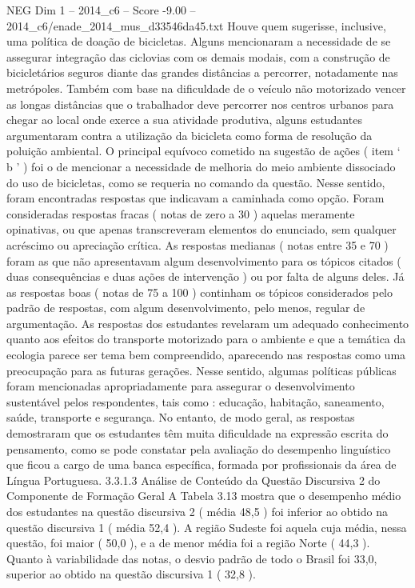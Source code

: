 \begin{textsample}{NEG Dim 1 – 2014\_c6 – Score -9.00 – 2014\_c6/enade\_2014\_mus\_d33546da45.txt}
Houve quem sugerisse, inclusive, uma política de doação de bicicletas.
Alguns mencionaram a necessidade de se assegurar integração das ciclovias com os demais modais, com a construção de bicicletários seguros diante das grandes distâncias a percorrer, notadamente nas metrópoles.
Também com base na dificuldade de o veículo não motorizado vencer as longas distâncias que o trabalhador deve percorrer nos centros urbanos para chegar ao local onde exerce a sua atividade produtiva, alguns estudantes argumentaram contra a utilização da bicicleta como forma de resolução da poluição ambiental.
O principal equívoco cometido na sugestão de ações ( item ‘ b ’ ) foi o de mencionar a necessidade de melhoria do meio ambiente dissociado do uso de bicicletas, como se requeria no comando da questão.
Nesse sentido, foram encontradas respostas que indicavam a caminhada como opção.
Foram consideradas respostas fracas ( notas de zero a 30 ) aquelas meramente opinativas, ou que apenas transcreveram elementos do enunciado, sem qualquer acréscimo ou apreciação crítica.
As respostas medianas ( notas entre 35 e 70 ) foram as que não apresentavam algum desenvolvimento para os tópicos citados ( duas consequências e duas ações de intervenção ) ou por falta de alguns deles.
Já as respostas boas ( notas de 75 a 100 ) continham os tópicos considerados pelo padrão de respostas, com algum desenvolvimento, pelo menos, regular de argumentação.
As respostas dos estudantes revelaram um adequado conhecimento quanto aos efeitos do transporte motorizado para o ambiente e que a temática da ecologia parece ser tema bem compreendido, aparecendo nas respostas como uma preocupação para as futuras gerações.
Nesse sentido, algumas políticas públicas foram mencionadas apropriadamente para assegurar o desenvolvimento sustentável pelos respondentes, tais como : educação, habitação, saneamento, saúde, transporte e segurança.
No entanto, de modo geral, as respostas demostraram que os estudantes têm muita dificuldade na expressão escrita do pensamento, como se pode constatar pela avaliação do desempenho linguístico que ficou a cargo de uma banca específica, formada por profissionais da área de Língua Portuguesa. 3.3.1.3 Análise de Conteúdo da Questão Discursiva 2 do Componente de Formação Geral A Tabela 3.13 mostra que o desempenho médio dos estudantes na questão discursiva 2 ( média 48,5 ) foi inferior ao obtido na questão discursiva 1 ( média 52,4 ).
A região Sudeste foi aquela cuja média, nessa questão, foi maior ( 50,0 ), e a de menor média foi a região Norte ( 44,3 ).
Quanto à variabilidade das notas, o desvio padrão de todo o Brasil foi 33,0, superior ao obtido na questão discursiva 1 ( 32,8 ).

\end{textsample}

